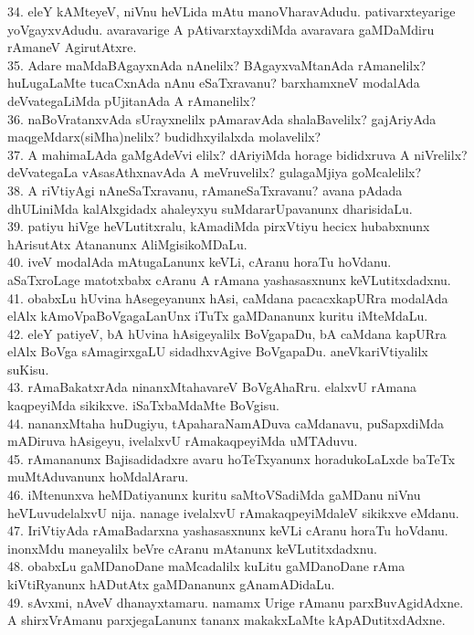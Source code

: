 \documentclass{article}
\begin{document}
34. eleY kAMteyeV, niVnu heVLida mAtu manoVharavAdudu. pativarxteyarige yoVgayxvAdudu. avaravarige A pAtivarxtayxdiMda avaravara gaMDaMdiru rAmaneV AgirutAtxre.\\
35. Adare maMdaBAgayxnAda nAnelilx? BAgayxvaMtanAda rAmanelilx? huLugaLaMte tucaCxnAda nAnu eSaTxravanu? barxhamxneV modalAda deVvategaLiMda pUjitanAda A rAmanelilx?\\
36. naBoVratanxvAda sUrayxnelilx pAmaravAda shalaBavelilx? gajAriyAda maqgeMdarx(siMha)nelilx? budidhxyilalxda molavelilx?\\
37. A mahimaLAda gaMgAdeVvi elilx? dAriyiMda horage bididxruva A niVrelilx? deVvategaLa vAsasAthxnavAda A meVruvelilx? gulagaMjiya goMcalelilx?\\
38. A riVtiyAgi nAneSaTxravanu, rAmaneSaTxravanu? avana pAdada dhULiniMda kalAlxgidadx ahaleyxyu suMdararUpavanunx dharisidaLu.\\
39. patiyu hiVge heVLutitxralu, kAmadiMda pirxVtiyu hecicx hubabxnunx hArisutAtx Atananunx AliMgisikoMDaLu.\\
40. iveV modalAda mAtugaLanunx keVLi, cAranu horaTu hoVdanu. aSaTxroLage matotxbabx cAranu A rAmana yashasasxnunx keVLutitxdadxnu.\\
41. obabxLu hUvina hAsegeyanunx hAsi, caMdana pacacxkapURra modalAda elAlx kAmoVpaBoVgagaLanUnx iTuTx gaMDananunx kuritu iMteMdaLu.\\
42. eleY patiyeV, bA hUvina hAsigeyalilx BoVgapaDu, bA caMdana kapURra elAlx BoVga sAmagirxgaLU sidadhxvAgive BoVgapaDu. aneVkariVtiyalilx suKisu.\\
43. rAmaBakatxrAda ninanxMtahavareV BoVgAhaRru. elalxvU rAmana kaqpeyiMda sikikxve. iSaTxbaMdaMte BoVgisu.\\
44. nananxMtaha huDugiyu, tApaharaNamADuva caMdanavu, puSapxdiMda mADiruva hAsigeyu, ivelalxvU rAmakaqpeyiMda uMTAduvu.\\
45. rAmananunx Bajisadidadxre avaru hoTeTxyanunx horadukoLaLxde baTeTx muMtAduvanunx hoMdalAraru.\\
46. iMtenunxva heMDatiyanunx kuritu saMtoVSadiMda gaMDanu niVnu heVLuvudelalxvU nija. nanage ivelalxvU rAmakaqpeyiMdaleV sikikxve eMdanu.\\
47. IriVtiyAda rAmaBadarxna yashasasxnunx keVLi cAranu horaTu hoVdanu. inonxMdu maneyalilx beVre cAranu mAtanunx keVLutitxdadxnu.\\
48. obabxLu gaMDanoDane maMcadalilx kuLitu gaMDanoDane rAma kiVtiRyanunx hADutAtx gaMDananunx gAnamADidaLu.\\
49. sAvxmi, nAveV dhanayxtamaru. namamx Urige rAmanu parxBuvAgidAdxne. A shirxVrAmanu parxjegaLanunx tananx makakxLaMte kApADutitxdAdxne.\\
\end{document}
